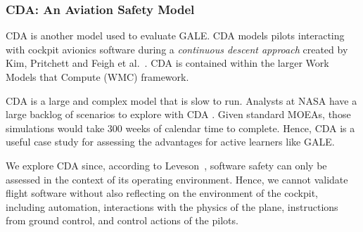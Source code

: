 \documentclass[10pt,journal,compsoc]{IEEEtran}
\begin{document}
\subsubsection{CDA: An Aviation Safety Model}\label{sec:cda}
CDA is another model used to evaluate GALE. CDA
models pilots interacting with cockpit avionics
software during a \emph{continuous descent approach}
created by Kim, Pritchett and Feigh et
al.~\cite{Kim2011,Pritchett2011,Feigh2012,Kim2013,Pritchett2013}.
CDA is contained within the larger Work Models that
Compute (WMC) framework.

CDA is a large and complex model that is slow to run.
Analysts at NASA have a large backlog of scenarios to explore with  CDA .
Given standard MOEAs, those simulations would take 300 weeks of calendar time to complete.  Hence, CDA is a useful
case study for assessing the advantages for  active learners like GALE.

We explore CDA since, according to Leveson~\cite{leven95},
software safety can only be assessed in the context
of its operating  
 environment. Hence, we cannot validate flight software without
 also  reflecting on the environment
of the cockpit, including  automation, interactions
with the physics of the plane, instructions from ground
control, and control actions of the pilots. 
\end{document}
